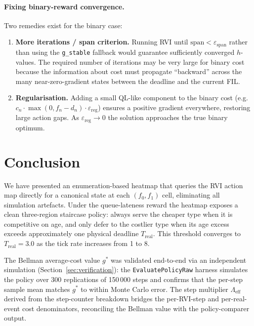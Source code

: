 \documentclass[11pt,a4paper]{article}
\begin{document}
\paragraph{Fixing binary-reward convergence.}
Two remedies exist for the binary case:
\begin{enumerate}
  \item \textbf{More iterations / span criterion.}  Running RVI until
        $\text{span} < \varepsilon_\text{span}$ rather than using the
        \texttt{g\_stable} fallback would guarantee sufficiently converged
        $h$-values.  The required number of iterations may be very large for
        binary cost because the information about cost must propagate
        ``backward'' across the many near-zero-gradient states between the
        deadline and the current FIL.

  \item \textbf{Regularisation.}  Adding a small QL-like component to the
        binary cost (e.g.\ $c_n \cdot \max(0, f_n - d_n) \cdot \varepsilon_\text{reg}$)
        ensures a positive gradient everywhere, restoring large action gaps.
        As $\varepsilon_\text{reg} \to 0$ the solution approaches the true
        binary optimum.
\end{enumerate}


\section{Conclusion}
\label{sec:conclusion}

We have presented an enumeration-based heatmap that queries the RVI action map
directly for a canonical state at each $(f_0, f_1)$ cell, eliminating all
simulation artefacts.  Under the queue-lateness reward the heatmap exposes a
clean three-region staircase policy: always serve the cheaper type when it is
competitive on age, and only defer to the costlier type when its age excess
exceeds approximately one physical deadline $T_\text{real}$.  This threshold
converges to $T_\text{real} = 3.0$ as the tick rate increases from 1 to 8.

The Bellman average-cost value $g^*$ was validated end-to-end via an
independent simulation (Section~\ref{sec:verification}): the
\texttt{EvaluatePolicyRaw} harness simulates the policy over 300 replications
of 150\,000 steps and confirms that the per-step sample mean matches $g^*$ to
within Monte Carlo error.  The step multiplier $\Lambda_\text{eff}$ derived
from the step-counter breakdown bridges the per-RVI-step and per-real-event
cost denominators, reconciling the Bellman value with the policy-comparer
output.
\end{document}
